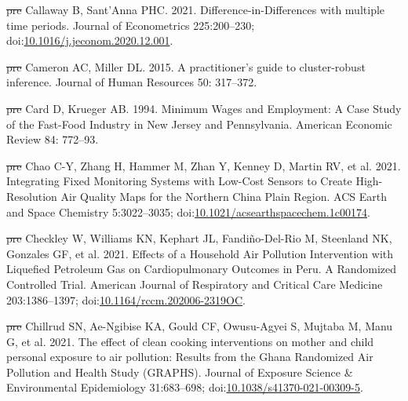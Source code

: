 \documentclass[
  letterpaper,
  DIV=11,
  numbers=noendperiod]{scrartcl}
\newlength{\cslhangindent}
\newenvironment{CSLReferences}[2] %
 {\begin{list}{}{%
  \setlength{\itemindent}{0pt} %
  \setlength{\leftmargin}{0pt} %
  \setlength{\parsep}{0pt} %
  \ifodd #1
   \setlength{\leftmargin}{\cslhangindent} %
   \setlength{\itemindent}{-1\cslhangindent} %
  \fi
  \setlength{\itemsep}{#2\baselineskip}}} %
 {\end{list}} %
\providecommand{\DIFdel}[1]{{\protect\color{red}\sout{#1}}}                      %
\providecommand{\DIFaddbegin}{} %
\providecommand{\DIFaddend}{} %
\providecommand{\DIFdelbegin}{} %
\providecommand{\DIFdelend}{} %
\newcommand{\DIFscaledelfig}{0.5}
\newlength{\DIFdelgraphicswidth} %
\newlength{\DIFdelgraphicsheight} %
\newcommand{\DIFaddincludegraphics}[2][]{{\color{blue}\fbox{\DIFOincludegraphics[#1]{#2}}}} %
\newcommand{\DIFdelincludegraphics}[2][]{%
\sbox{\DIFdelgraphicsbox}{\DIFOincludegraphics[#1]{#2}}%
\settoboxwidth{\DIFdelgraphicswidth}{\DIFdelgraphicsbox} %
\settoboxtotalheight{\DIFdelgraphicsheight}{\DIFdelgraphicsbox} %
\scalebox{\DIFscaledelfig}{%
\parbox[b]{\DIFdelgraphicswidth}{\usebox{\DIFdelgraphicsbox}\\[-\baselineskip] \rule{\DIFdelgraphicswidth}{0em}}\llap{\resizebox{\DIFdelgraphicswidth}{\DIFdelgraphicsheight}{%
\setlength{\unitlength}{\DIFdelgraphicswidth}%
\begin{picture}(1,1)%
\thicklines\linethickness{2pt} %
{\color[rgb]{1,0,0}\put(0,0){\framebox(1,1){}}}%
{\color[rgb]{1,0,0}\put(0,0){\line( 1,1){1}}}%
{\color[rgb]{1,0,0}\put(0,1){\line(1,-1){1}}}%
\end{picture}%
}\hspace*{3pt}}} %
} %
\DeclareRobustCommand{\DIFaddbegin}{\DIFOaddbegin \let\includegraphics\DIFaddincludegraphics} %
\DeclareRobustCommand{\DIFaddend}{\DIFOaddend \let\includegraphics\DIFOincludegraphics} %
\DeclareRobustCommand{\DIFdelbegin}{\DIFOdelbegin \let\includegraphics\DIFdelincludegraphics} %
\DeclareRobustCommand{\DIFdelend}{\DIFOaddend \let\includegraphics\DIFOincludegraphics} %
\begin{document}
\begin{CSLReferences}{1}{1}
\DIFdelbegin %
\DIFdel{pre}%
\DIFdelend \DIFaddbegin {}
\DIFaddend Callaway B, Sant'Anna PHC. 2021. Difference-in-{Differences} with
multiple time periods. Journal of Econometrics 225:200--230;
doi:\href{https://doi.org/10.1016/j.jeconom.2020.12.001}{10.1016/j.jeconom.2020.12.001}.

\DIFdelbegin %
\DIFdel{pre}%
\DIFdelend \DIFaddbegin {}
\DIFaddend Cameron AC, Miller DL. 2015. A practitioner's guide to cluster-robust
inference. Journal of Human Resources 50: 317--372.

\DIFdelbegin %
\DIFdel{pre}%
\DIFdelend \DIFaddbegin {}
\DIFaddend Card D, Krueger AB. 1994. Minimum {Wages} and {Employment}: {A Case
Study} of the {Fast-Food Industry} in {New Jersey} and {Pennsylvania}.
American Economic Review 84: 772--93.

\DIFdelbegin %
\DIFdel{pre}%
\DIFdelend \DIFaddbegin {}
\DIFaddend Chao C-Y, Zhang H, Hammer M, Zhan Y, Kenney D, Martin RV, et al. 2021.
Integrating {Fixed Monitoring Systems} with {Low-Cost Sensors} to
{Create High-Resolution Air Quality Maps} for the {Northern China Plain
Region}. ACS Earth and Space Chemistry 5:3022--3035;
doi:\href{https://doi.org/10.1021/acsearthspacechem.1c00174}{10.1021/acsearthspacechem.1c00174}.

\DIFdelbegin %
\DIFdel{pre}%
\DIFdelend \DIFaddbegin {}
\DIFaddend Checkley W, Williams KN, Kephart JL, Fandiño-Del-Rio M, Steenland NK,
Gonzales GF, et al. 2021. Effects of a {Household Air Pollution
Intervention} with {Liquefied Petroleum Gas} on {Cardiopulmonary
Outcomes} in {Peru}. {A Randomized Controlled Trial}. American Journal
of Respiratory and Critical Care Medicine 203:1386--1397;
doi:\href{https://doi.org/10.1164/rccm.202006-2319OC}{10.1164/rccm.202006-2319OC}.

\DIFdelbegin %
\DIFdel{pre}%
\DIFdelend \DIFaddbegin {}
\DIFaddend Chillrud SN, Ae-Ngibise KA, Gould CF, Owusu-Agyei S, Mujtaba M, Manu G,
et al. 2021. The effect of clean cooking interventions on mother and
child personal exposure to air pollution: Results from the {Ghana
Randomized Air Pollution} and {Health Study} ({GRAPHS}). Journal of
Exposure Science \& Environmental Epidemiology 31:683--698;
doi:\href{https://doi.org/10.1038/s41370-021-00309-5}{10.1038/s41370-021-00309-5}.


\end{CSLReferences}
\end{document}
